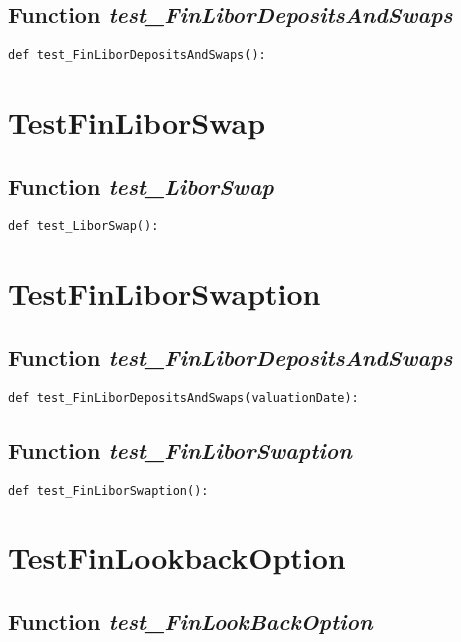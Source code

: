 \documentclass[twoside,11pt]{book}
\begin{document}
\subsection{Function {\it test\_FinLiborDepositsAndSwaps}}


\begin{lstlisting}
def test_FinLiborDepositsAndSwaps():
\end{lstlisting}


\newpage
\section{TestFinLiborSwap}

\subsection{Function {\it test\_LiborSwap}}


\begin{lstlisting}
def test_LiborSwap(): 
\end{lstlisting}


\newpage
\section{TestFinLiborSwaption}

\subsection{Function {\it test\_FinLiborDepositsAndSwaps}}


\begin{lstlisting}
def test_FinLiborDepositsAndSwaps(valuationDate):
\end{lstlisting}

\subsection{Function {\it test\_FinLiborSwaption}}


\begin{lstlisting}
def test_FinLiborSwaption():
\end{lstlisting}


\newpage
\section{TestFinLookbackOption}

\subsection{Function {\it test\_FinLookBackOption}}
\end{document}
